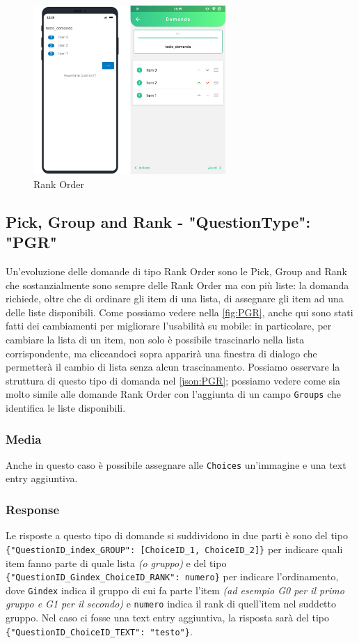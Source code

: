 \begin{figure}[h!]
\centering
\includegraphics[width=0.65\textwidth]{img/rank_order}
\caption{Rank Order}
\label{fig:rank_order}
\end{figure}

\clearpage
\subsection{Pick, Group and Rank - "QuestionType": "PGR"}
Un'evoluzione delle domande di tipo Rank Order sono le Pick, Group and Rank che sostanzialmente sono sempre delle Rank Order ma con più liste: la domanda richiede, oltre che di ordinare gli item di una lista, di assegnare gli item ad una delle liste disponibili. Come possiamo vedere nella \autoref{fig:PGR}, anche qui sono stati fatti dei cambiamenti per migliorare l'usabilità su mobile: in particolare, per cambiare la lista di un item, non solo è possibile trascinarlo nella lista corrispondente, ma cliccandoci sopra apparirà una finestra di dialogo che permetterà il cambio di lista senza alcun trascinamento. Possiamo osservare la struttura di questo tipo di domanda nel \autoref{json:PGR}; possiamo vedere come sia molto simile alle domande Rank Order con l'aggiunta di un campo \texttt{Groups} che identifica le liste disponibili.

\subsubsection{Media}
Anche in questo caso è possibile assegnare alle \texttt{Choices} un'immagine e una text entry aggiuntiva.

\subsubsection{Response}
Le risposte a questo tipo di domande si suddividono in due parti è sono del tipo \texttt{\{"QuestionID\_index\_GROUP": [ChoiceID\_1, ChoiceID\_2]\}} per indicare quali item fanno parte di quale lista \textit{(o gruppo)} e del tipo\\ \texttt{\{"QuestionID\_Gindex\_ChoiceID\_RANK": numero\}} per indicare l'ordinamento, dove \texttt{Gindex} indica il gruppo di cui fa parte l'item \textit{(ad esempio G0 per il primo gruppo e G1 per il secondo)} e \texttt{numero} indica il rank di quell'item nel suddetto gruppo.
Nel caso ci fosse una text entry aggiuntiva, la risposta sarà del tipo \texttt{\{"QuestionID\_ChoiceID\_TEXT": "testo"\}}.

